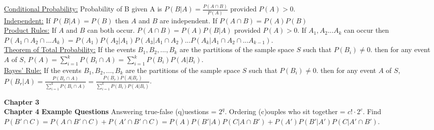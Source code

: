 \documentclass[9pt]{article}
\begin{document}
\begin{multicols}{2}
            \underline{Conditional Probability:} Probability of B given A is $P(B|A)=\frac{P(A\cap B)}{P(A)}$ provided $P(A) > 0$.\\
            \underline{Independent:} If $P(B|A) = P(B)$ then $A$ and $B$ are independent. If $P(A\cap B)=P(A)P(B)$\\
            \underline{Product Rules:} If $A$ and $B$ can both occur. $P(A\cap B) = P(A)P(B|A)$ provided $P(A)>0$. If $A_1,A_2...A_k$ can occur then $P(A_1\cap A_2\cap ... A_k) = P(A_1)P(A_2|A_1)P(A_3|A_1\cap A_2)...P(A_k|A_1\cap A_2\cap ... A_{k-1})$.\\
            \underline{Theorem of Total Probability:} If the events $B_1, B_2,...,B_k$ are the partitions of the sample space $S$ such that $P(B_i)\not= 0$. then for any event $A$ of $S$, $P(A)=\sum_{i=1}^{k}P(B_i\cap A)=\sum_{i=1}^{k}P(B_i)P(A|B_i)$.\\
            \underline{Bayes' Rule:} If the events $B_1, B_2,...,B_k$ are the partitions of the sample space $S$ such that $P(B_i)\not= 0$. then for any event $A$ of $S$, $P(B_r|A) = \frac{P(B_r\cap A)}{\sum_{i=1}^{k}P(B_i\cap A)} = \frac{P(B_r)P(A|B_r)}{\sum_{i=1}^{k}P(B_i)P(A|B_i)}$.\\
        \end{multicols}
    \noindent\textbf{Chapter 3}
    \\
    \noindent\textbf{Chapter 4}
    \noindent\textbf{Example Questions} 
        Answering true-false (q)uestions = $2^{q}$.
        Ordering (c)ouples who sit together = $c!\cdot 2^c$.
        Find $P(B'\cap C) = P(A\cap B'\cap C)+P(A'\cap B'\cap C) = P(A)P(B'|A)P(C|A\cap B') + P(A')P(B'|A')P(C|A'\cap B')$.
\end{document}
